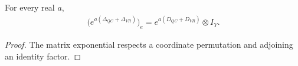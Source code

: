 \begin{theorem}
\label{thm:five_factor_pair_middle_merge_exponential}
\leanok
For every real $a$,
\begin{align*}
 \bigl(e^{a(\Delta_{QC}+\Delta_{VR})}\bigr)_e
 =e^{a(D_{QC}+D_{VR})}\otimes I_Y.
\end{align*}
\end{theorem}
\begin{proof}\leanok
{}
The matrix exponential respects a coordinate permutation and adjoining
an identity factor.
\end{proof}
